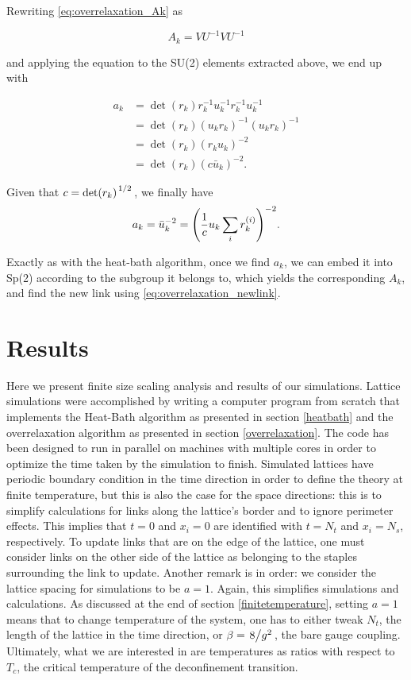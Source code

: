\documentclass[reqno,12pt]{article}
\numberwithin{equation}{section}
\begin{document}
Rewriting \eqref{eq:overrelaxation_Ak} as

\begin{equation}
	A_k = V U^{-1} V U^{-1}
\end{equation}

and applying the equation to the SU(2) elements extracted above, we end up with

\begin{equation}
	\begin{aligned}
		a_k &= \det(r_k) r_k^{-1} u_k^{-1} r_k^{-1} u_k^{-1} \\
		&= \det(r_k) (u_k r_k)^{-1} (u_k r_k)^{-1} \\
		&= \det(r_k) (r_k u_k)^{-2} \\
		&= \det(r_k) (c \bar{u}_k)^{-2}.
	\end{aligned}
\end{equation}

Given that $c = \det(r_k)^{\flatfrac{1}{2}}$, we finally have
\begin{equation}
	a_k = \bar{u}_k^{-2} = \qty(\frac{1}{c} u_k \sum_i r_k^{(i)})^{-2}.
\end{equation}

Exactly as with the heat-bath algorithm, once we find $a_k$, we can embed it into Sp(2) according to the
subgroup it belongs to, which yields the corresponding $A_k$, and find the new link using \eqref{eq:overrelaxation_newlink}.

\newpage

\section{Results} \label{results}

Here we present finite size scaling analysis and results of our simulations. Lattice simulations were accomplished
by writing a computer program from scratch that implements the Heat-Bath algorithm as presented in section
\ref{heatbath} and the overrelaxation algorithm as presented in section \ref{overrelaxation}. 
The code has been designed to run in parallel on machines with multiple cores in order to
optimize the time taken by the simulation to finish. Simulated lattices have periodic boundary condition in the time
direction in order to define the theory at finite temperature, but this is also the case for the space directions:
this is to simplify calculations for links along the lattice's border and to ignore perimeter effects. This implies
that $t = 0$ and $x_i = 0$ are identified with $t = N_t$ and $x_i = N_s$, respectively.
To update links that are on the edge of the lattice, one must consider links on the other side of the lattice as 
belonging to the staples surrounding the link to update. Another remark is in order: we consider the lattice spacing
for simulations to be $a = 1$. Again, this simplifies simulations and calculations. As discussed at the end of
section \ref{finitetemperature}, setting $a = 1$ means that to change temperature of the system, one has to either
tweak $N_t$, the length of the lattice in the time direction, or $\beta = \flatfrac{8}{g^2}$, the bare gauge
coupling. Ultimately, what we are interested in are temperatures as ratios with respect to $T_c$, the critical 
temperature of the deconfinement transition.
\end{document}
